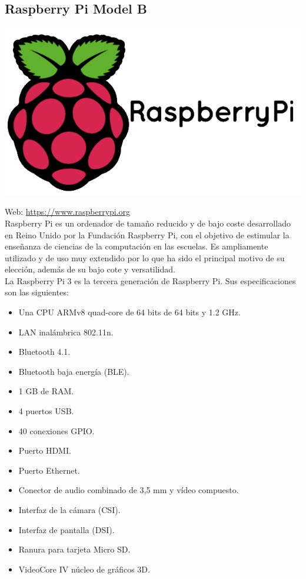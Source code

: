 \subsection{Raspberry Pi Model B}
\label{sec:raspberry}


\begin{center}
\includegraphics[scale=0.3]{imagenes/RaspberryPi-logo.png}
\end{center}

Web: \url{https://www.raspberrypi.org}\\

Raspberry Pi es un ordenador de tamaño reducido y de bajo coste desarrollado en Reino Unido por la Fundación Raspberry Pi, con el objetivo de estimular la enseñanza de ciencias de la computación
en las escuelas. Es ampliamente utilizado y de uso muy extendido por lo que ha sido el principal motivo de su elección, además de su bajo cote y versatilidad.\\

La Raspberry Pi 3 es la tercera generación de Raspberry Pi. Sus especificaciones son las siguientes:

\begin{itemize}
 \item Una CPU ARMv8 quad-core de 64 bits de 64 bits y 1.2 GHz.
 \item LAN inalámbrica 802.11n.
 \item Bluetooth 4.1.
 \item Bluetooth baja energía (BLE).
 \item 1 GB de RAM.
 \item 4 puertos USB.
 \item 40 conexiones GPIO.
 \item Puerto HDMI.
 \item Puerto Ethernet.
 \item Conector de audio combinado de 3,5 mm y vídeo compuesto.
 \item Interfaz de la cámara (CSI).
 \item Interfaz de pantalla (DSI).
 \item Ranura para tarjeta Micro SD.
 \item VideoCore IV núcleo de gráficos 3D. 
\end{itemize}


